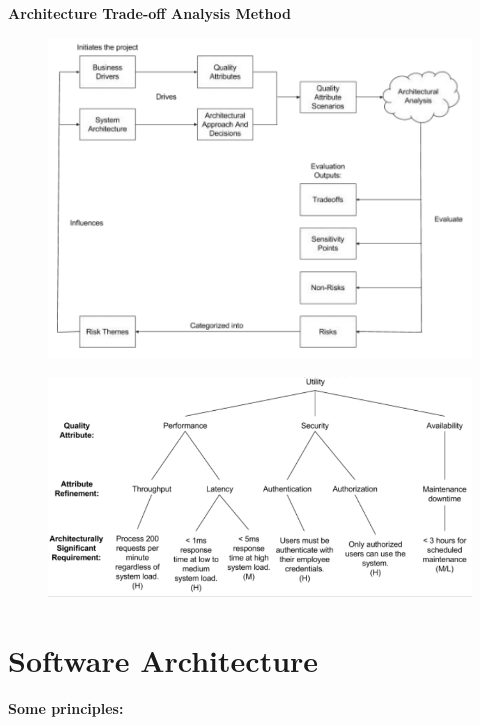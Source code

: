 \textbf{Architecture Trade-off Analysis Method}
\begin{figure}[ht!]
\centering
\includegraphics[width=\textwidth]{oborove/SWA/img/ATAM.png}
\end{figure}

\pagebreak
\begin{figure}[ht!]
\centering
\includegraphics[width=\textwidth]{oborove/SWA/img/tree.png}
\end{figure}

\section{Software Architecture}

\textbf{Some principles:}

